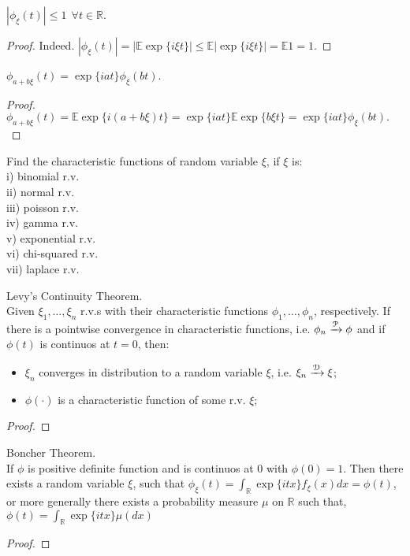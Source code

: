 \begin{proposition}
$|\phi_{\xi}(t)| \le 1 \: \: \forall t \in \mathbb{R}$.
\end{proposition}
\begin{proof}
Indeed. $|\phi_{\xi}(t)| = |\mathbb{E} \exp\{i\xi t\}| \le \mathbb{E} |\exp\{i\xi t\}| =\mathbb{E} 1 =1$.
\end{proof}
\begin{proposition}
$\phi_{a+b\xi}(t) = \exp\{iat\} \phi_{\xi}(bt)$.
\end{proposition}
\begin{proof}
$\phi_{a+b\xi}(t) = \mathbb{E} \exp\{i(a+b\xi)t\} = \exp\{iat\} \mathbb{E} \exp\{b\xi t\} = \exp\{iat\} \phi_{\xi}(bt).$
\end{proof}
\begin{exc}
Find the characteristic functions of random variable $\xi$, if $\xi$ is: \\
i) binomial r.v. \\
ii) normal r.v. \\
iii) poisson r.v. \\
iv) gamma r.v. \\
v) exponential r.v. \\
vi) chi-squared r.v. \\
vii) laplace r.v.  \\
\end{exc}
\begin{theorem}
Levy's Continuity Theorem. \\ Given $\xi_1, \dots, \xi_n$ r.v.s with their characteristic functions $\phi_1, \dots, \phi_n$, respectively. If there is a pointwise convergence in characteristic functions, i.e. $\phi_n \xrightarrow{{\cal{P}}} \phi$ and if $\phi(t)$ is continuos at $t=0$, then:
\begin{itemize}
\item $\xi_n$ converges in distribution to a random variable $\xi$, i.e. $\xi_n \xrightarrow{{\cal{D}}} \xi$;
\item $\phi(\cdot)$ is a characteristic function of some r.v. $\xi$;
\end{itemize}
\end{theorem}
\begin{proof}

\end{proof}
\begin{theorem}
Boncher Theorem. \\
If $\phi$ is positive definite function and is continuos at $0$ with $\phi(0)=1$. Then there exists a random variable $\xi$, such that $\phi_{\xi}(t) =\int_{\mathbb{R}}\exp\{itx\} f_{\xi}(x) dx =  \phi(t)$, or more generally there exists a probability measure $\mu$ on $\mathbb{R}$ such that, $\phi(t) = \int_{\mathbb{R}}\exp\{itx\} \mu(dx)$
\end{theorem}
\begin{proof}
\end{proof}